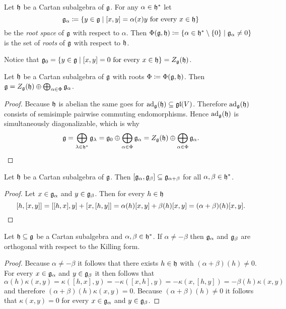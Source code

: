

\begin{defi}
 Let $\mathfrak{h}$ be a Cartan subalgebra of $\mathfrak{g}$. For any $\alpha \in \mathfrak{h}^*$ let
 \[
  \mathfrak{g}_\alpha \coloneqq \{y \in \mathfrak{g} \mid \text{$[x,y] = \alpha(x)y$ for every $x \in \mathfrak{h}$}\}
 \]
 be the \emph{root space} of $\mathfrak{g}$ with respect to $\alpha$. Then $\Phi(\mathfrak{g}, \mathfrak{h}) \coloneqq \{\alpha \in \mathfrak{h}^* \setminus \{0\} \mid \mathfrak{g}_\alpha \neq 0\}$ is the set of \emph{roots} of $\mathfrak{g}$ with respect to $\mathfrak{h}$.
\end{defi}


\begin{rem}
 Notice that $\mathfrak{g}_0 = \{y \in \mathfrak{g} \mid \text{$[x,y] = 0$ for every $x \in \mathfrak{h}$}\} = Z_{\mathfrak{g}}(\mathfrak{h})$.
\end{rem}



\begin{lem}
 Let $\mathfrak{h}$ be a Cartan subalgebra of $\mathfrak{g}$ with roots $\Phi \coloneqq \Phi(\mathfrak{g}, \mathfrak{h})$. Then $\mathfrak{g} = Z_{\mathfrak{g}}(\mathfrak{h}) \oplus \bigoplus_{\alpha \in \Phi} \mathfrak{g}_\alpha$.
\end{lem}
\begin{proof}
 Because $\mathfrak{h}$ is abelian the same goes for $\operatorname{ad}_{\mathfrak{g}}(\mathfrak{h}) \subseteq \mathfrak{gl}(V)$. Therefore $\operatorname{ad}_{\mathfrak{g}}(\mathfrak{h})$ consists of semisimple pairwise commuting endomorphisms. Hence $\operatorname{ad}_{\mathfrak{g}}(\mathfrak{h})$ is simultaneously diagonalizable, which is why
 \[
  \mathfrak{g}
  = \bigoplus_{\lambda \in \mathfrak{h}^*} \mathfrak{g}_\lambda
  = \mathfrak{g}_0 \oplus \bigoplus_{\alpha \in \Phi} \mathfrak{g}_\alpha
  = Z_{\mathfrak{g}}(\mathfrak{h}) \oplus \bigoplus_{\alpha \in \Phi} \mathfrak{g}_\alpha.
  \qedhere
 \]
\end{proof}




\begin{lem}
 Let $\mathfrak{h}$ be a Cartan subalgebra of $\mathfrak{g}$. Then $[\mathfrak{g}_\alpha, \mathfrak{g}_\beta] \subseteq \mathfrak{g}_{\alpha+\beta}$ for all $\alpha, \beta \in \mathfrak{h}^*$.
\end{lem}
\begin{proof}
 Let $x \in \mathfrak{g}_\alpha$ and $y \in \mathfrak{g}_\beta$. Then for every $h \in \mathfrak{h}$
 \[
  [h,[x,y]]
  = [[h,x],y] + [x,[h,y]]
  = \alpha(h)[x,y] + \beta(h)[x,y]
  = (\alpha+\beta)(h) [x,y].
  \qedhere
 \]
\end{proof}


\begin{lem}\label{lem: root spaces orthogonal with respect to the Killing form}
Let $\mathfrak{h} \subseteq \mathfrak{g}$ be a Cartan subalgebra and $\alpha, \beta \in \mathfrak{h}^*$. If $\alpha \neq -\beta$ then $\mathfrak{g}_\alpha$ and $\mathfrak{g}_\beta$ are orthogonal with respect to the Killing form.
\end{lem}
\begin{proof}
 Because $\alpha \neq -\beta$ it follows that there exists $h \in \mathfrak{h}$ with $(\alpha+\beta)(h) \neq 0$. For every $x \in \mathfrak{g}_\alpha$ and $y \in \mathfrak{g}_\beta$ it then follows that
 \[
  \alpha(h) \kappa(x,y)
  = \kappa([h,x],y)
  = -\kappa([x,h],y)
  = -\kappa(x,[h,y])
  = -\beta(h)\kappa(x,y)
 \]
 and therefore $(\alpha+\beta)(h)\kappa(x,y) = 0$. Because $(\alpha+\beta)(h) \neq 0$ it follows that $\kappa(x,y) = 0$ for every $x \in \mathfrak{g}_\alpha$ and $y \in \mathfrak{g}_\beta$.
\end{proof}


